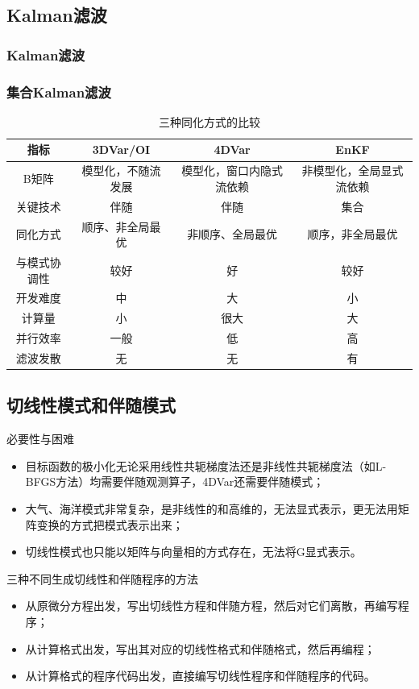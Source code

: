 \documentclass{article}
\begin{document}
\subsection{Kalman滤波}
\subsubsection{Kalman滤波}
\subsubsection{集合Kalman滤波}
\begin{table}[h!]
  \begin{center}
    \caption{三种同化方式的比较}
    \begin{tabular}{c|c|c|c} 
      \textbf{指标} & \textbf{3DVar/OI} & \textbf{4DVar} & \textbf{EnKF}\\
      \hline
      B矩阵 & 模型化，不随流发展 & 模型化，窗口内隐式流依赖 & 非模型化，全局显式流依赖 \\
      关键技术 & 伴随 & 伴随 & 集合\\
      同化方式 & 顺序、非全局最优 & 非顺序、全局最优 & 顺序，非全局最优\\
      与模式协调性 & 较好 & 好 &  较好\\
      开发难度&中&大&小\\
      计算量&小&很大&大\\
      并行效率&一般&低&高\\
      滤波发散&无&无&有
    \end{tabular}
  \end{center}
  \end{table}

\subsection{切线性模式和伴随模式}
必要性与困难
\begin{itemize}
    \item 目标函数的极小化无论采用线性共轭梯度法还是非线性共轭梯度法（如L-BFGS方法）均需要伴随观测算子，4DVar还需要伴随模式；
    \item 大气、海洋模式非常复杂，是非线性的和高维的，无法显式表示，更无法用矩阵变换的方式把模式表示出来；
    \item 切线性模式也只能以矩阵与向量相的方式存在，无法将G显式表示。
\end{itemize}

三种不同生成切线性和伴随程序的方法
\begin{itemize}
    \item 从原微分方程出发，写出切线性方程和伴随方程，然后对它们离散，再编写程序；
    \item 从计算格式出发，写出其对应的切线性格式和伴随格式，然后再编程；
    \item 从计算格式的程序代码出发，直接编写切线性程序和伴随程序的代码。
\end{itemize}
\end{document}
